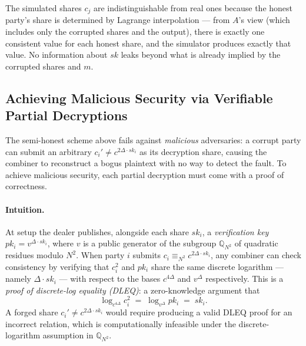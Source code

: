 \begin{remark}
  The simulated shares $c_j$ are indistinguishable from real ones because the honest
  party's share is determined by Lagrange interpolation --- from $A$'s view (which includes
  only the corrupted shares and the output), there is exactly one consistent value for each
  honest share, and the simulator produces exactly that value. No information about $sk$
  leaks beyond what is already implied by the corrupted shares and $m$.
\end{remark}

\subsection{Achieving Malicious Security via Verifiable Partial Decryptions}

The semi-honest scheme above fails against \emph{malicious} adversaries: a corrupt party
can submit an arbitrary $c_i' \neq c^{2\Delta \cdot sk_i}$ as its decryption share,
causing the combiner to reconstruct a bogus plaintext with no way to detect the fault.
To achieve malicious security, each partial decryption must come with a proof of
correctness.

\paragraph{Intuition.}
At setup the dealer publishes, alongside each share $sk_i$, a \emph{verification key}
$pk_i = v^{\Delta \cdot sk_i}$, where $v$ is a public generator of the subgroup
$\mathbb{Q}_{N^2}$ of quadratic residues modulo $N^2$.  When party $i$ submits
$c_i \equiv_{N^2} c^{2\Delta \cdot sk_i}$, any combiner can check consistency by
verifying that $c_i^2$ and $pk_i$ share the same discrete logarithm --- namely
$\Delta \cdot sk_i$ --- with respect to the bases $c^{4\Delta}$ and $v^{\Delta}$
respectively.  This is a \emph{proof of discrete-log equality (DLEQ)}: a
zero-knowledge argument that
\[
  \log_{c^{4\Delta}} c_i^2 \;=\; \log_{v^{\Delta}} pk_i \;=\; sk_i.
\]
A forged share $c_i' \neq c^{2\Delta \cdot sk_i}$ would require producing a valid DLEQ
proof for an incorrect relation, which is computationally infeasible under the
discrete-logarithm assumption in $\mathbb{Q}_{N^2}$.

